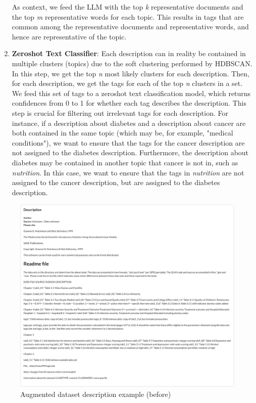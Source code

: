 \begin{enumerate}
    As context, we feed the LLM with the top \textit{k} representative documents and the top \textit{m} representative words for each topic. This results in tags that are common among the representative documents and representative words, and hence are representative of the topic.
    \item \textbf{Zeroshot Text Classifier}: Each description can in reality be contained in multiple clusters (topics) due to the soft clustering performed by HDBSCAN. In this step, we get the top \textit{n} most likely clusters for each description. Then, for each description, we get the tags for each of the top \textit{n} clusters in a set. We feed this set of tags to a zeroshot text classification model, which returns confidences from 0 to 1 for whether each tag describes the description. This step is crucial for filtering out irrelevant tags for each description. For instance, if a description about diabetes and a description about cancer are both contained in the same topic (which may be, for example, "medical conditions"), we want to ensure that the tags for the cancer description are not assigned to the diabetes description. Furthermore, the description about diabetes may be contained in another topic that cancer is not in, such as \textit{nutrition}. In this case, we want to ensure that the tags in \textit{nutrition} are not assigned to the cancer description, but are assigned to the diabetes description.

\end{enumerate}

\begin{figure}[h]
    \centering
    \includegraphics[width=\textwidth]{figures/augmented_description_before.png}
    \caption{Augmented dataset description example (before)}
    \label{fig:augmented_description_before}
\end{figure}

